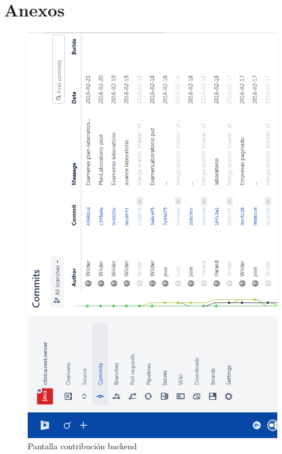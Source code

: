 \chapter{Anexos}	
	\newpage
	
	\begin{figure}[H]
	    \centering
		\includegraphics[width=13cm]{../imgs/ui/bitbucket-back.png}
		\caption{Pantalla contribución backend}
		\label{figure:bitbucket-back}
	\end{figure}
	
